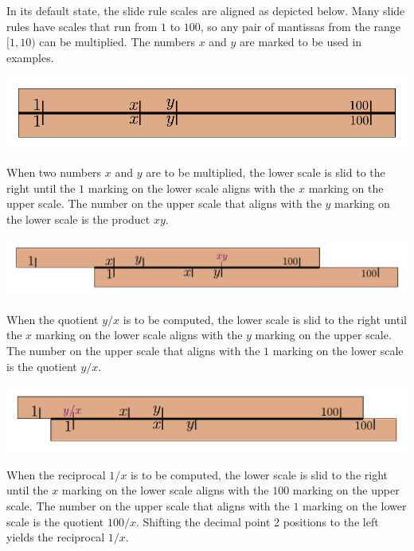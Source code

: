 \documentclass{article}
\begin{document}
In its default state, the slide rule scales are aligned as depicted below. Many slide rules have scales that run from \(1\) to \(100\), so any pair of mantissas from the range \([1, 10)\) can be multiplied. The numbers \(x\) and \(y\) are marked to be used in examples.

\begin{center}
\includegraphics[scale = 0.5]{slide_rule}
\end{center}    

When two numbers \(x\) and \(y\) are to be multiplied, the lower scale is slid to the right until the \(1\) marking on the lower scale aligns with the \(x\) marking on the upper scale. The number on the upper scale that aligns with the \(y\) marking on the lower scale is the product \(xy\). 

\begin{center}
\includegraphics[scale = 0.5]{slide_rule_multiplication}
\end{center}   

When the quotient \(y/x\) is to be computed, the lower scale is slid to the right until the \(x\) marking on the lower scale aligns with the \(y\) marking on the upper scale. The number on the upper scale that aligns with the \(1\) marking on the lower scale is the quotient \(y/x\). 

\begin{center}
\includegraphics[scale = 0.5]{slide_rule_division}
\end{center}   

When the reciprocal \(1/x\) is to be computed, the lower scale is slid to the right until the \(x\) marking on the lower scale aligns with the \(100\) marking on the upper scale. The number on the upper scale that aligns with the \(1\) marking on the lower scale is the quotient \(100/x\). Shifting the decimal point 2 positions to the left yields the reciprocal \(1/x\). 
\end{document}
